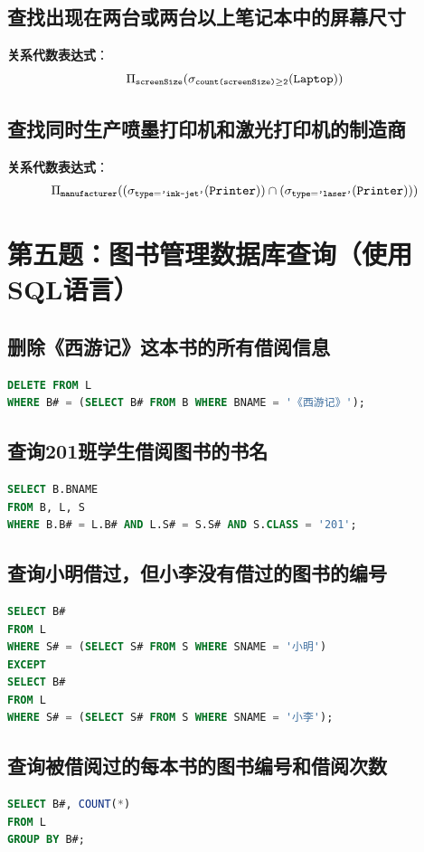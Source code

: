 \documentclass[11pt]{article} %
\begin{document}
\subsection{查找出现在两台或两台以上笔记本中的屏幕尺寸}
\textbf{关系代数表达式}：
\[
\Pi_{\text{\texttt{screenSize}}}(\sigma_{\text{\texttt{count(screenSize)}} \geq \texttt{2}}(\text{\texttt{Laptop}}))
\]

\subsection{查找同时生产喷墨打印机和激光打印机的制造商}
\textbf{关系代数表达式}：
\[
\Pi_{\text{\texttt{manufacturer}}}((\sigma_{\text{\texttt{type}}=\texttt{'ink-jet'}}(\text{\texttt{Printer}})) \cap (\sigma_{\text{\texttt{type}}=\texttt{'laser'}}(\text{\texttt{Printer}})))
\]

\section{第五题：图书管理数据库查询（使用 SQL语言）}

\subsection{删除《西游记》这本书的所有借阅信息}
\begin{lstlisting}[language=SQL]
DELETE FROM L
WHERE B# = (SELECT B# FROM B WHERE BNAME = '《西游记》');
\end{lstlisting}

\subsection{查询201班学生借阅图书的书名}
\begin{lstlisting}[language=SQL]
SELECT B.BNAME
FROM B, L, S
WHERE B.B# = L.B# AND L.S# = S.S# AND S.CLASS = '201';
\end{lstlisting}

\subsection{查询小明借过，但小李没有借过的图书的编号}
\begin{lstlisting}[language=SQL]
SELECT B#
FROM L
WHERE S# = (SELECT S# FROM S WHERE SNAME = '小明')
EXCEPT
SELECT B#
FROM L
WHERE S# = (SELECT S# FROM S WHERE SNAME = '小李');
\end{lstlisting}

\subsection{查询被借阅过的每本书的图书编号和借阅次数}
\begin{lstlisting}[language=SQL]
SELECT B#, COUNT(*)
FROM L
GROUP BY B#;
\end{lstlisting}
\end{document}
